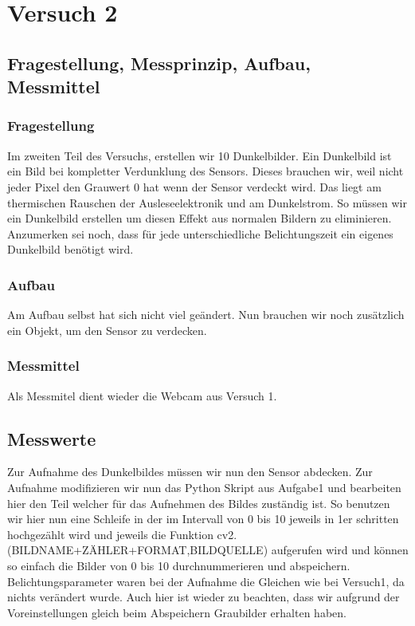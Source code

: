 \documentclass[TGAI_Laborbericht.tex]{subfiles}
\begin{document}
\chapter{Versuch 2}
\label{chap:VERSUCH_2}


\section{Fragestellung, Messprinzip, Aufbau, Messmittel}
\label{chap:VERSUCH_2_FRAGESTELLUNG}
\subsection{Fragestellung}

Im zweiten Teil des Versuchs, erstellen wir 10 Dunkelbilder. Ein Dunkelbild ist ein Bild bei kompletter Verdunklung des Sensors. Dieses brauchen wir, weil nicht jeder Pixel den Grauwert 0 hat wenn der Sensor verdeckt wird. Das liegt am thermischen Rauschen der Ausleseelektronik und am Dunkelstrom. So müssen wir ein Dunkelbild erstellen um diesen Effekt aus normalen Bildern zu eliminieren. Anzumerken sei noch, dass für jede unterschiedliche Belichtungszeit ein eigenes Dunkelbild benötigt wird.


\subsection{Aufbau}

Am Aufbau selbst hat sich nicht viel geändert. Nun brauchen wir noch zusätzlich ein Objekt, um den Sensor zu verdecken.

\subsection{Messmittel}

Als Messmitel dient wieder die Webcam aus Versuch 1.

\section{Messwerte}
\label{chap:VERSUCH_2_MESSWERTE}
Zur Aufnahme des Dunkelbildes müssen wir nun den Sensor abdecken. Zur Aufnahme modifizieren wir nun das Python Skript aus Aufgabe1 und bearbeiten hier den Teil welcher für das Aufnehmen des Bildes zuständig ist. So benutzen wir hier nun eine Schleife in der im Intervall von 0 bis 10 jeweils in 1er schritten hochgezählt wird und jeweils die Funktion cv2.(BILDNAME+ZÄHLER+FORMAT,BILDQUELLE) aufgerufen wird und können so einfach die Bilder von 0 bis 10 durchnummerieren und abspeichern. Belichtungsparameter waren bei der Aufnahme die Gleichen wie bei Versuch1, da nichts verändert wurde. Auch hier ist wieder zu beachten, dass wir aufgrund der Voreinstellungen gleich beim Abspeichern Graubilder erhalten haben.
\end{document}
